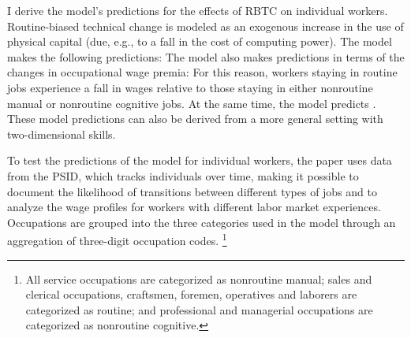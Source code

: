 \documentclass[12pt]{article}
\newcommand{\highlightP}[1]{{\emph{\color{MyPink}{#1}}}}
\theoremstyle{definition}
\begin{document}
I derive the model's predictions for the effects of RBTC on individual workers. Routine-biased technical change is modeled as an exogenous increase in the use of physical capital (due, e.g., to a fall in the cost of computing power). The model makes the following predictions: \highlightP{RBTC induces workers at the bottom of the ability distribution within routine occupations to switch to nonroutine manual jobs, while it induces those at the top to switch to nonroutine cognitive jobs.} The model also makes predictions in terms of the changes in occupational wage premia: \highlightP{the wage premium in routine occupations is predicted to fall relative to that in the two nonroutine occupations.} For this reason, workers staying in routine jobs experience a fall in wages relative to those staying in either nonroutine manual or nonroutine cognitive jobs. At the same time, the model predicts \highlightP{that switchers must do at least as well as stayers in terms of wage growth}. These model predictions can also be derived from a more general setting with two-dimensional skills.

To test the predictions of the model for individual workers, the paper uses data from the PSID, which tracks individuals over time, making it possible to document the likelihood of transitions between different types of jobs and to analyze the wage profiles for workers with different labor market experiences. Occupations are grouped into the three categories used in the model through an aggregation of three-digit occupation codes. \footnote{All service occupations are categorized as nonroutine manual; sales and clerical occupations, craftsmen, foremen, operatives and laborers are categorized as routine; and professional and managerial occupations are categorized as nonroutine cognitive.}
\end{document}

